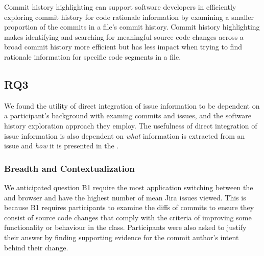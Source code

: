 \begin{summary}[RQ2]
  Commit history highlighting can support software developers in efficiently 
  exploring commit history for code rationale information 
  by examining a smaller proportion of the commits in a file's commit history.
  Commit history highlighting makes identifying and searching for meaningful source code changes 
  across a broad commit history more efficient but has less impact when trying to find rationale information for specific code segments in a file.
\end{summary}


\subsection{RQ3}
\label{subsec:RQ3}


We found the utility of direct integration of issue information 
to be dependent on a participant's background with examing commits and issues,
and the software history exploration approach they employ.
The usefulness of direct integration of issue information is also dependent on 
\emph{what} information is extracted from an issue and \emph{how} it is presented in the .

\subsubsection{Breadth and Contextualization}

We anticipated question B1  require the most application switching between the  
and browser and have the highest number of mean Jira issues viewed.
This is because B1 requires participants to examine the diffs of commits to ensure they consist of source code changes 
that comply with the criteria of improving some functionality or behaviour in the  class.
Participants were also asked to justify their answer by finding supporting evidence for the commit author's intent behind their change.

